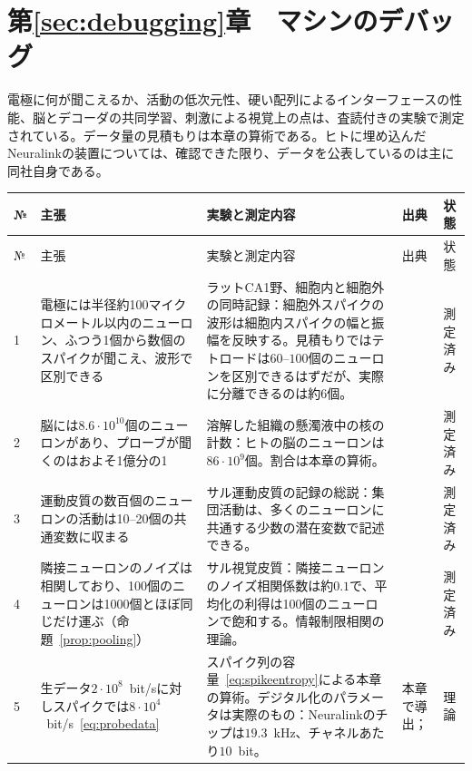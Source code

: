 \section{第\ref{sec:debugging}章　マシンのデバッグ}

電極に何が聞こえるか、活動の低次元性、硬い配列によるインターフェースの性能、脳とデコーダの共同学習、刺激による視覚上の点は、査読付きの実験で測定されている。データ量の見積もりは本章の算術である。ヒトに埋め込んだNeuralinkの装置については、確認できた限り、データを公表しているのは主に同社自身である。

{\footnotesize
\setlength{\tabcolsep}{3pt}\renewcommand{\arraystretch}{1.15}
\begin{longtable}{>{\raggedright}p{0.5cm}>{\raggedright}p{4.0cm}>{\raggedright}p{5.6cm}>{\raggedright}p{2.3cm}>{\raggedright\arraybackslash}p{1.7cm}}
\toprule
№ & 主張 & 実験と測定内容 & 出典 & 状態 \\
\midrule\endfirsthead
\toprule
№ & 主張 & 実験と測定内容 & 出典 & 状態 \\
\midrule\endhead
1 & 電極には半径約100マイクロメートル以内のニューロン、ふつう1個から数個のスパイクが聞こえ、波形で区別できる & ラットCA1野、細胞内と細胞外の同時記録：細胞外スパイクの波形は細胞内スパイクの幅と振幅を反映する。見積もりではテトロードは$60$--$100$個のニューロンを区別できるはずだが、実際に分離できるのは約6個。 & \cite{Henze2000extra} & 測定済み \\
2 & 脳には$8.6\cdot10^{10}$個のニューロンがあり、プローブが聞くのはおよそ1億分の1 & 溶解した組織の懸濁液中の核の計数：ヒトの脳のニューロンは$86\cdot10^9$個。割合は本章の算術。 & \cite{Azevedo2009} & 測定済み \\
3 & 運動皮質の数百個のニューロンの活動は10--20個の共通変数に収まる & サル運動皮質の記録の総説：集団活動は、多くのニューロンに共通する少数の潜在変数で記述できる。 & \cite{Gallego2017} & 測定済み \\
4 & 隣接ニューロンのノイズは相関しており、100個のニューロンは1000個とほぼ同じだけ運ぶ（命題~\ref{prop:pooling}） & サル視覚皮質：隣接ニューロンのノイズ相関係数は約$0.1$で、平均化の利得は100個のニューロンで飽和する。情報制限相関の理論。 & \cite{Zohary1994, MorenoBote2014} & 測定済み \\
5 & 生データ$2\cdot10^8$~bit/sに対しスパイクでは$8\cdot10^4$~bit/s~\eqref{eq:probedata} & スパイク列の容量~\eqref{eq:spikeentropy}による本章の算術。デジタル化のパラメータは実際のもの：Neuralinkのチップは$19.3$~kHz、チャネルあたり$10$~bit。 & 本章で導出；\cite{Rieke1997, Musk2019} & 理論 \\

\end{longtable}}
